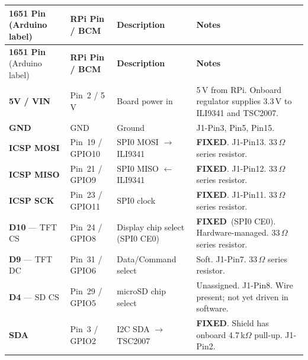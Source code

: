 \documentclass[11pt,a4paper]{article}
\newcommand{\fixed}{\textbf{FIXED}}
\begin{document}
\begin{longtable}{C{1.6cm} C{1.5cm} L{2.8cm} L{6.8cm}}
  \toprule
  \color{white}\textbf{1651 Pin} \newline \color{white}\footnotesize(Arduino label) &
  \color{white}\textbf{RPi Pin / BCM} &
  \color{white}\textbf{Description} &
  \color{white}\textbf{Notes} \\
  \midrule
  \endfirsthead
  \toprule
  \color{white}\textbf{1651 Pin} \newline \color{white}\footnotesize(Arduino label) &
  \color{white}\textbf{RPi Pin / BCM} &
  \color{white}\textbf{Description} &
  \color{white}\textbf{Notes} \\
  \midrule
  \endhead
  \bottomrule
  \endfoot

  \textbf{5V / VIN} & Pin~2 / 5\,V &
  Board power in &
  5\,V from RPi. Onboard regulator supplies 3.3\,V to ILI9341 and TSC2007. \\

  \textbf{GND} & GND &
  Ground &
  J1-Pin3, Pin5, Pin15. \\

  \textbf{ICSP MOSI} & Pin~19 / GPIO10 &
  SPI0 MOSI $\to$ ILI9341 &
  \fixed. J1-Pin13. 33\,$\Omega$ series resistor. \\

  \textbf{ICSP MISO} & Pin~21 / GPIO9 &
  SPI0 MISO $\leftarrow$ ILI9341 &
  \fixed. J1-Pin12. 33\,$\Omega$ series resistor. \\

  \textbf{ICSP SCK} & Pin~23 / GPIO11 &
  SPI0 clock &
  \fixed. J1-Pin11. 33\,$\Omega$ series resistor. \\

  \textbf{D10} --- TFT CS & Pin~24 / GPIO8 &
  Display chip select (SPI0 CE0) &
  \fixed\ (SPI0 CE0). Hardware-managed. 33\,$\Omega$ series resistor. \\

  \textbf{D9} --- TFT DC & Pin~31 / GPIO6 &
  Data/Command select &
  Soft. J1-Pin7. 33\,$\Omega$ series resistor. \\

  \textbf{D4} --- SD CS & Pin~29 / GPIO5 &
  microSD chip select &
  Unassigned. J1-Pin8. Wire present; not yet driven in software. \\

  \textbf{SDA} & Pin~3 / GPIO2 &
  I2C SDA $\to$ TSC2007 &
  \fixed. Shield has onboard 4.7\,k$\Omega$ pull-up. J1-Pin2. \\


\end{longtable}
\end{document}
